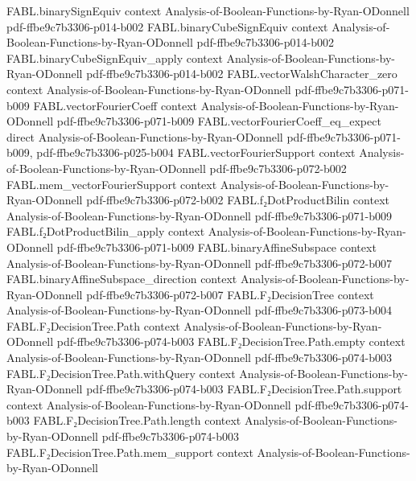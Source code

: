 \begin{theorem}
\proofstep
  {FABL.binarySignEquiv}
  {context}
  {Analysis-of-Boolean-Functions-by-Ryan-ODonnell}
  {pdf-ffbe9c7b3306-p014-b002}
\proofstep
  {FABL.binaryCubeSignEquiv}
  {context}
  {Analysis-of-Boolean-Functions-by-Ryan-ODonnell}
  {pdf-ffbe9c7b3306-p014-b002}
\proofstep
  {FABL.binaryCubeSignEquiv_apply}
  {context}
  {Analysis-of-Boolean-Functions-by-Ryan-ODonnell}
  {pdf-ffbe9c7b3306-p014-b002}
\proofstep
  {FABL.vectorWalshCharacter_zero}
  {context}
  {Analysis-of-Boolean-Functions-by-Ryan-ODonnell}
  {pdf-ffbe9c7b3306-p071-b009}
\proofstep
  {FABL.vectorFourierCoeff}
  {context}
  {Analysis-of-Boolean-Functions-by-Ryan-ODonnell}
  {pdf-ffbe9c7b3306-p071-b009}
\proofstep
  {FABL.vectorFourierCoeff_eq_expect}
  {direct}
  {Analysis-of-Boolean-Functions-by-Ryan-ODonnell}
  {pdf-ffbe9c7b3306-p071-b009,
    pdf-ffbe9c7b3306-p025-b004}
\proofstep
  {FABL.vectorFourierSupport}
  {context}
  {Analysis-of-Boolean-Functions-by-Ryan-ODonnell}
  {pdf-ffbe9c7b3306-p072-b002}
\proofstep
  {FABL.mem_vectorFourierSupport}
  {context}
  {Analysis-of-Boolean-Functions-by-Ryan-ODonnell}
  {pdf-ffbe9c7b3306-p072-b002}
\proofstep
  {FABL.f₂DotProductBilin}
  {context}
  {Analysis-of-Boolean-Functions-by-Ryan-ODonnell}
  {pdf-ffbe9c7b3306-p071-b009}
\proofstep
  {FABL.f₂DotProductBilin_apply}
  {context}
  {Analysis-of-Boolean-Functions-by-Ryan-ODonnell}
  {pdf-ffbe9c7b3306-p071-b009}
\proofstep
  {FABL.binaryAffineSubspace}
  {context}
  {Analysis-of-Boolean-Functions-by-Ryan-ODonnell}
  {pdf-ffbe9c7b3306-p072-b007}
\proofstep
  {FABL.binaryAffineSubspace_direction}
  {context}
  {Analysis-of-Boolean-Functions-by-Ryan-ODonnell}
  {pdf-ffbe9c7b3306-p072-b007}
\proofstep
  {FABL.F₂DecisionTree}
  {context}
  {Analysis-of-Boolean-Functions-by-Ryan-ODonnell}
  {pdf-ffbe9c7b3306-p073-b004}
\proofstep
  {FABL.F₂DecisionTree.Path}
  {context}
  {Analysis-of-Boolean-Functions-by-Ryan-ODonnell}
  {pdf-ffbe9c7b3306-p074-b003}
\proofstep
  {FABL.F₂DecisionTree.Path.empty}
  {context}
  {Analysis-of-Boolean-Functions-by-Ryan-ODonnell}
  {pdf-ffbe9c7b3306-p074-b003}
\proofstep
  {FABL.F₂DecisionTree.Path.withQuery}
  {context}
  {Analysis-of-Boolean-Functions-by-Ryan-ODonnell}
  {pdf-ffbe9c7b3306-p074-b003}
\proofstep
  {FABL.F₂DecisionTree.Path.support}
  {context}
  {Analysis-of-Boolean-Functions-by-Ryan-ODonnell}
  {pdf-ffbe9c7b3306-p074-b003}
\proofstep
  {FABL.F₂DecisionTree.Path.length}
  {context}
  {Analysis-of-Boolean-Functions-by-Ryan-ODonnell}
  {pdf-ffbe9c7b3306-p074-b003}
\proofstep
  {FABL.F₂DecisionTree.Path.mem_support}
  {context}
  {Analysis-of-Boolean-Functions-by-Ryan-ODonnell}

\end{theorem}
